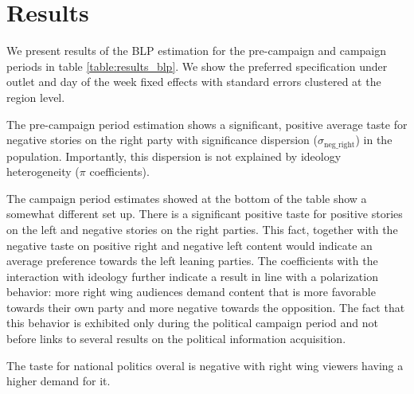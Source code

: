 \documentclass[12pt]{article}
\begin{document}
\section{Results}

\label{section:results}


We present results of the BLP estimation for the pre-campaign and campaign periods in table   \ref{table:results_blp}. We show the preferred specification under outlet and day of the week fixed effects with standard errors clustered at the region level. 

The pre-campaign period estimation shows a significant, positive average taste for negative stories on the right party with significance dispersion ($\sigma_{\text{neg\_right}}$) in the population. Importantly, this dispersion is not explained by ideology heterogeneity ($\pi$ coefficients).

The campaign period estimates showed at the bottom of the table show a somewhat different set up. There is a significant positive taste for positive stories on the left and negative stories on the right parties. This fact, together with the negative taste on positive right and negative left content would indicate an average preference towards the left leaning parties. The coefficients with the interaction with ideology further indicate a result in line with a polarization behavior: more right wing audiences demand content that is more favorable towards their own party and more negative towards the opposition. The fact that this behavior is exhibited only during the political campaign period and not before links to several results on the political information acquisition.  

The taste for national politics overal is negative with right wing viewers having a higher demand for it. 

\end{document}

